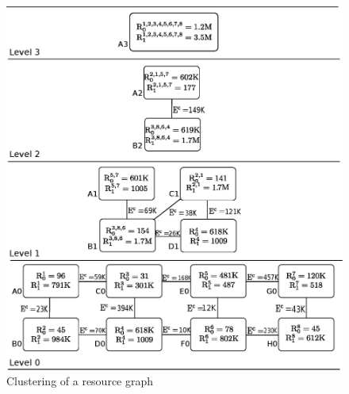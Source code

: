 



\begin{figure}[ht]
  \includegraphics[scale=0.4]{./figures/resource}
  \caption{Clustering of a resource graph}
  \label{fig:res}
  \vspace{-0.4cm}
\end{figure}


